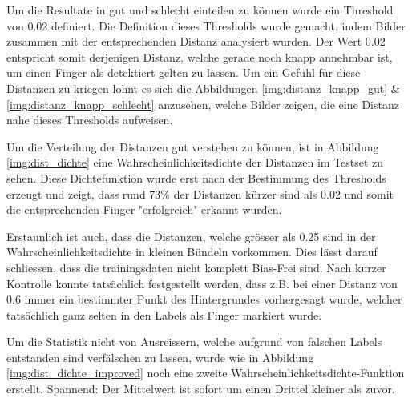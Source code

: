 \documentclass[a4paper,12pt]{article}
\begin{document}
Um die Resultate in gut und schlecht einteilen zu können wurde ein Threshold von 0.02 definiert.
Die Definition dieses Thresholds wurde gemacht, indem Bilder zusammen mit der entsprechenden Distanz analysiert wurden.
Der Wert 0.02 entspricht somit derjenigen Distanz, welche gerade noch knapp annehmbar ist, um einen Finger als detektiert gelten zu lassen.
Um ein Gefühl für diese Distanzen zu kriegen lohnt es sich die Abbildungen \ref{img:distanz_knapp_gut} \& \ref{img:distanz_knapp_schlecht} anzusehen, welche Bilder zeigen, die eine Distanz nahe dieses Thresholds aufweisen. 

Um die Verteilung der Distanzen gut verstehen zu können, ist in Abbildung \ref{img:dist_dichte} eine Wahrscheinlichkeitsdichte der Distanzen im Testset zu sehen. Diese Dichtefunktion wurde erst nach der Bestimmung des Thresholds erzeugt und zeigt, dass rund 73\% der Distanzen kürzer sind als 0.02 und somit die entsprechenden Finger "erfolgreich" erkannt wurden.

Erstaunlich ist auch, dass die Distanzen, welche grösser als 0.25 sind in der Wahrscheinlichkeitsdichte in kleinen Bündeln vorkommen. 
Dies lässt darauf schliessen, dass die trainingsdaten nicht komplett Bias-Frei sind.
Nach kurzer Kontrolle konnte tatsächlich festgestellt werden, dass z.B. bei einer Distanz von 0.6 immer ein bestimmter Punkt des Hintergrundes vorhergesagt wurde, welcher tatsächlich ganz selten in den Labels als Finger markiert wurde. 

Um die Statistik nicht von Ausreissern, welche aufgrund von falschen Labels entstanden sind verfälschen zu lassen, wurde wie in Abbildung \ref{img:dist_dichte_improved} noch eine zweite Wahrscheinlichkeitsdichte-Funktion erstellt. Spannend: Der Mittelwert ist sofort um einen Drittel kleiner als zuvor. 
\end{document}
